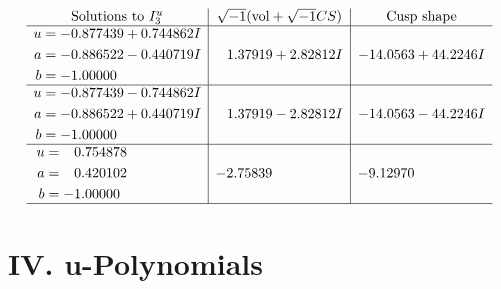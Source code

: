 \documentclass[1p]{elsarticle_modified}
\theoremstyle{definition}
\newcommand{\I}{\sqrt{-1}}
\begin{document}
$$\begin{array}{c|c|c}  
\text{Solutions to }I^u_{3}& \I (\text{vol} + \sqrt{-1}CS) & \text{Cusp shape}\\
 \hline 
\begin{aligned}
u &= -0.877439 + 0.744862 I \\
a &= -0.886522 - 0.440719 I \\
b &= -1.00000\phantom{ +0.000000I}\end{aligned}
 & \phantom{-}1.37919 + 2.82812 I & -14.0563 + 44.2246 I \\ \hline\begin{aligned}
u &= -0.877439 - 0.744862 I \\
a &= -0.886522 + 0.440719 I \\
b &= -1.00000\phantom{ +0.000000I}\end{aligned}
 & \phantom{-}1.37919 - 2.82812 I & -14.0563 - 44.2246 I \\ \hline\begin{aligned}
u &= \phantom{-}0.754878\phantom{ +0.000000I} \\
a &= \phantom{-}0.420102\phantom{ +0.000000I} \\
b &= -1.00000\phantom{ +0.000000I}\end{aligned}
 & -2.75839\phantom{ +0.000000I} & -9.12970\phantom{ +0.000000I}\\
 \hline 
 \end{array}$$\newpage
\newpage\renewcommand{\arraystretch}{1}
\centering \section*{ IV. u-Polynomials}
\end{document}
